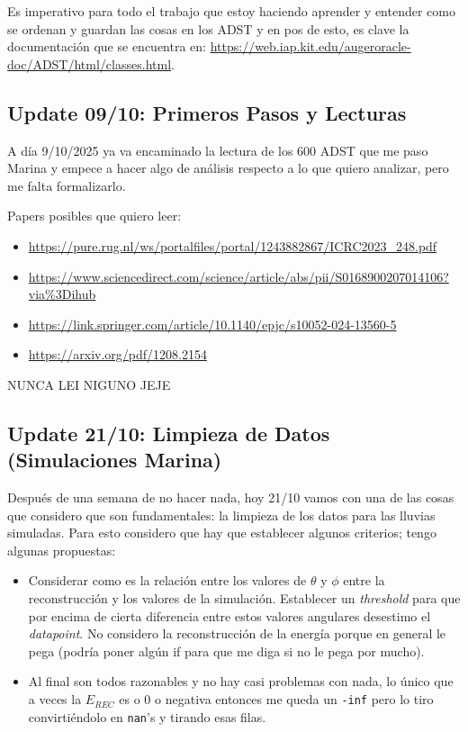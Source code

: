 Es imperativo para todo el trabajo que estoy haciendo aprender y entender como se ordenan y guardan las cosas en los ADST y en pos de esto, es clave la documentación que se encuentra en: \url{https://web.iap.kit.edu/augeroracle-doc/ADST/html/classes.html}.

\subsection*{Update 09/10: Primeros Pasos y Lecturas}

A día 9/10/2025 ya va encaminado la lectura de los 600 ADST que me paso Marina y empece a hacer algo de análisis respecto a lo que quiero analizar, pero me falta formalizarlo.

Papers posibles que quiero leer:
\begin{itemize}
	\item \url{https://pure.rug.nl/ws/portalfiles/portal/1243882867/ICRC2023_248.pdf}
	\item \url{https://www.sciencedirect.com/science/article/abs/pii/S0168900207014106?via%3Dihub}
	\item \url{https://link.springer.com/article/10.1140/epjc/s10052-024-13560-5}
	\item \url{https://arxiv.org/pdf/1208.2154}
\end{itemize}

NUNCA LEI NIGUNO JEJE


\subsection*{Update 21/10: Limpieza de Datos (Simulaciones Marina)}

Después de una semana de no hacer nada, hoy 21/10 vamos con una de las cosas que considero que son fundamentales: la limpieza de los datos para las lluvias simuladas. Para esto considero que hay que establecer algunos criterios; tengo algunas propuestas:

\begin{itemize}
	\item Considerar como es la relación entre los valores de $\theta$ y $\phi$ entre la reconstrucción y los valores de la simulación. Establecer un \textit{threshold} para que por encima de cierta diferencia entre estos valores angulares desestimo el \textit{datapoint}. No considero la reconstrucción de la energía porque en general le pega (podría poner algún if para que me diga si no le pega por mucho).
	\item Al final son todos razonables y no hay casi problemas con nada, lo único que a veces la $E_{REC}$ es o 0 o negativa entonces me queda un \lstinline|-inf| pero lo tiro convirtiéndolo en \lstinline|nan|'s y tirando esas filas.
\end{itemize}

